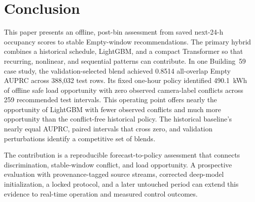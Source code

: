 \section{Conclusion}

This paper presents an offline, post-bin assessment from saved next-24-h occupancy scores to stable Empty-window recommendations. The primary hybrid combines a historical schedule, LightGBM, and a compact Transformer so that recurring, nonlinear, and sequential patterns can contribute. In one Building~59 case study, the validation-selected blend achieved 0.8514 all-overlap Empty AUPRC across 388,032 test rows. Its fixed one-hour policy identified 490.1~kWh of offline safe load opportunity with zero observed camera-label conflicts across 259 recommended test intervals. This operating point offers nearly the opportunity of LightGBM with fewer observed conflicts and much more opportunity than the conflict-free historical policy. The historical baseline's nearly equal AUPRC, paired intervals that cross zero, and validation perturbations identify a competitive set of blends.

The contribution is a reproducible forecast-to-policy assessment that connects discrimination, stable-window conflict, and load opportunity. A prospective evaluation with provenance-tagged source streams, corrected deep-model initialization, a locked protocol, and a later untouched period can extend this evidence to real-time operation and measured control outcomes.
